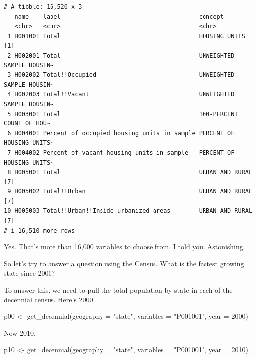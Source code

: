 \documentclass[
  letterpaper,
  DIV=11,
  numbers=noendperiod]{scrreprt}
\newenvironment{Shaded}{\begin{snugshade}}{\end{snugshade}}
\newcommand{\AttributeTok}[1]{\textcolor[rgb]{0.40,0.45,0.13}{#1}}
\newcommand{\DecValTok}[1]{\textcolor[rgb]{0.68,0.00,0.00}{#1}}
\newcommand{\FunctionTok}[1]{\textcolor[rgb]{0.28,0.35,0.67}{#1}}
\newcommand{\NormalTok}[1]{\textcolor[rgb]{0.00,0.23,0.31}{#1}}
\newcommand{\OtherTok}[1]{\textcolor[rgb]{0.00,0.23,0.31}{#1}}
\newcommand{\StringTok}[1]{\textcolor[rgb]{0.13,0.47,0.30}{#1}}
\begin{document}
\begin{verbatim}
# A tibble: 16,520 x 3
   name    label                                       concept                  
   <chr>   <chr>                                       <chr>                    
 1 H001001 Total                                       HOUSING UNITS [1]        
 2 H002001 Total                                       UNWEIGHTED SAMPLE HOUSIN~
 3 H002002 Total!!Occupied                             UNWEIGHTED SAMPLE HOUSIN~
 4 H002003 Total!!Vacant                               UNWEIGHTED SAMPLE HOUSIN~
 5 H003001 Total                                       100-PERCENT COUNT OF HOU~
 6 H004001 Percent of occupied housing units in sample PERCENT OF HOUSING UNITS~
 7 H004002 Percent of vacant housing units in sample   PERCENT OF HOUSING UNITS~
 8 H005001 Total                                       URBAN AND RURAL [7]      
 9 H005002 Total!!Urban                                URBAN AND RURAL [7]      
10 H005003 Total!!Urban!!Inside urbanized areas        URBAN AND RURAL [7]      
# i 16,510 more rows
\end{verbatim}

Yes. That's more than 16,000 variables to choose from. I told you.
Astonishing.

So let's try to answer a question using the Census. What is the fastest
growing state since 2000?

To answer this, we need to pull the total population by state in each of
the decennial census. Here's 2000.

\begin{Shaded}
\begin{Highlighting}[]
\NormalTok{p00 }\OtherTok{\textless{}{-}} \FunctionTok{get\_decennial}\NormalTok{(}\AttributeTok{geography =} \StringTok{"state"}\NormalTok{, }\AttributeTok{variables =} \StringTok{"P001001"}\NormalTok{, }\AttributeTok{year =} \DecValTok{2000}\NormalTok{)}
\end{Highlighting}
\end{Shaded}

Now 2010.

\begin{Shaded}
\begin{Highlighting}[]
\NormalTok{p10 }\OtherTok{\textless{}{-}} \FunctionTok{get\_decennial}\NormalTok{(}\AttributeTok{geography =} \StringTok{"state"}\NormalTok{, }\AttributeTok{variables =} \StringTok{"P001001"}\NormalTok{, }\AttributeTok{year =} \DecValTok{2010}\NormalTok{)}
\end{Highlighting}
\end{Shaded}
\end{document}
